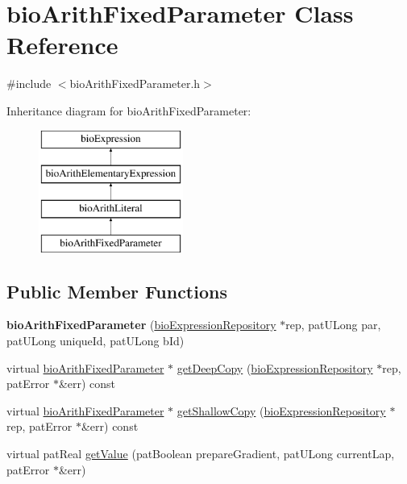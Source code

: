 \hypertarget{classbio_arith_fixed_parameter}{}\section{bio\+Arith\+Fixed\+Parameter Class Reference}
\label{classbio_arith_fixed_parameter}


{\ttfamily \#include $<$bio\+Arith\+Fixed\+Parameter.\+h$>$}

Inheritance diagram for bio\+Arith\+Fixed\+Parameter\+:\begin{figure}[H]
\begin{center}
\leavevmode
\includegraphics[height=4.000000cm]{classbio_arith_fixed_parameter}
\end{center}
\end{figure}
\subsection*{Public Member Functions}
\begin{DoxyCompactItemize}
\item 
\mbox{\label{classbio_arith_fixed_parameter_a80ea6a846533ac52342c48712bc997d2}} 
{\bfseries bio\+Arith\+Fixed\+Parameter} (\hyperlink{classbio_expression_repository}{bio\+Expression\+Repository} $\ast$rep, pat\+U\+Long par, pat\+U\+Long unique\+Id, pat\+U\+Long b\+Id)
\item 
virtual \hyperlink{classbio_arith_fixed_parameter}{bio\+Arith\+Fixed\+Parameter} $\ast$ \hyperlink{classbio_arith_fixed_parameter_a91c2dcaf2be8731defb45a02108b7b82}{get\+Deep\+Copy} (\hyperlink{classbio_expression_repository}{bio\+Expression\+Repository} $\ast$rep, pat\+Error $\ast$\&err) const
\item 
virtual \hyperlink{classbio_arith_fixed_parameter}{bio\+Arith\+Fixed\+Parameter} $\ast$ \hyperlink{classbio_arith_fixed_parameter_a0743b72d00d4f769ec3c01faae8ebac8}{get\+Shallow\+Copy} (\hyperlink{classbio_expression_repository}{bio\+Expression\+Repository} $\ast$rep, pat\+Error $\ast$\&err) const
\item 
virtual pat\+Real \hyperlink{classbio_arith_fixed_parameter_a0eed9a884a07681f00da9b42e559cd8c}{get\+Value} (pat\+Boolean prepare\+Gradient, pat\+U\+Long current\+Lap, pat\+Error $\ast$\&err)
\end{DoxyCompactItemize}
